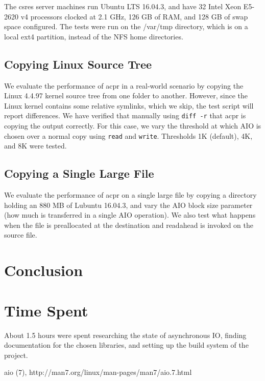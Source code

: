 \documentclass[11pt]{article}
\begin{document}
The csres server machines run Ubuntu LTS 16.04.3, and have 32 Intel Xeon E5-2620 v4 processors clocked at 2.1 GHz, 126 GB of RAM, and 128 GB of swap space configured. The tests were run on the /var/tmp directory, which is on a local ext4 partition, instead of the NFS home directories.

\subsection{Copying Linux Source Tree}
We evaluate the performance of acpr in a real-world scenario by copying the Linux 4.4.97 kernel source tree from one folder to another. However, since the Linux kernel contains some relative symlinks, which we skip, the test script will report differences. We have verified that manually using \texttt{diff -r} that acpr is copying the output correctly. For this case, we vary the threshold at which AIO is chosen over a normal copy using \texttt{read} and \texttt{write}. Thresholds 1K (default), 4K, and 8K were tested. 

\subsection{Copying a Single Large File}
We evaluate the performance of acpr on a single large file by copying a directory holding an 880 MB of Lubuntu 16.04.3, and vary the AIO block size parameter (how much is transferred in a single AIO operation). We also test what happens when the file is preallocated at the destination and readahead is invoked on the source file.



\section{Conclusion}

\section{Time Spent}

About 1.5 hours were spent researching the state of asynchronous IO, finding
documentation for the chosen libraries, and setting up the build system of the
project.

\begin{thebibliography}{99}
        aio (7), http://man7.org/linux/man-pages/man7/aio.7.html
\end{thebibliography}
\end{document}

